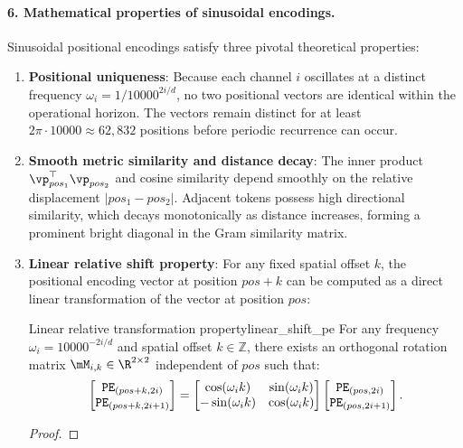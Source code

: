 \documentclass[../../main.tex]{subfiles}
\begin{document}
\paragraph{6. Mathematical properties of sinusoidal encodings.}
Sinusoidal positional encodings satisfy three pivotal theoretical properties:
\begin{enumerate}
    \item \textbf{Positional uniqueness}: Because each channel $i$ oscillates at a distinct frequency $\omega_i = 1 / 10000^{2i/d}$, no two positional vectors are identical within the operational horizon. The vectors remain distinct for at least $2\pi \cdot 10000 \approx 62{,}832$ positions before periodic recurrence can occur.
    \item \textbf{Smooth metric similarity and distance decay}: The inner product $\vp_{pos_1}^\top \vp_{pos_2}$ and cosine similarity depend smoothly on the relative displacement $|pos_1 - pos_2|$. Adjacent tokens possess high directional similarity, which decays monotonically as distance increases, forming a prominent bright diagonal in the Gram similarity matrix.
    \item \textbf{Linear relative shift property}: For any fixed spatial offset $k$, the positional encoding vector at position $pos + k$ can be computed as a direct linear transformation of the vector at position $pos$:
    \begin{theorem}{Linear relative transformation property}{linear_shift_pe}
    For any frequency $\omega_i = 10000^{-2i/d}$ and spatial offset $k \in \mathbb{Z}$, there exists an orthogonal rotation matrix $\mM_{i, k} \in \R^{2 \times 2}$ independent of $pos$ such that:
    \begin{equation}
    \label{eq:linear_pe_rotation}
    \begin{bmatrix} \text{\texttt{PE}}_{(pos+k, 2i)} \\ \text{\texttt{PE}}_{(pos+k, 2i+1)} \end{bmatrix} = \begin{bmatrix} \cos(\omega_i k) & \sin(\omega_i k) \\ -\sin(\omega_i k) & \cos(\omega_i k) \end{bmatrix} \begin{bmatrix} \text{\texttt{PE}}_{(pos, 2i)} \\ \text{\texttt{PE}}_{(pos, 2i+1)} \end{bmatrix}.
    \end{equation}
    \end{theorem}
    \begin{proof}

\end{proof}
\end{enumerate}
\end{document}
